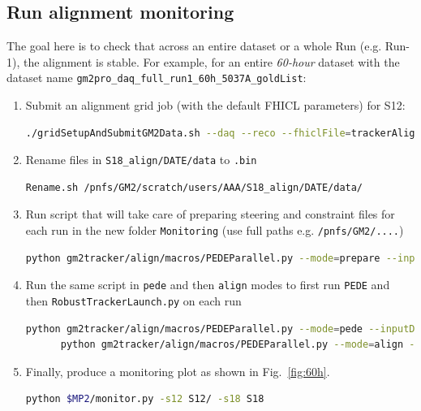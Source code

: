 \documentclass[12pt]{article}
\begin{document}
\subsection{Run alignment monitoring}
The goal here is to check that across an entire dataset or a whole Run (e.g. Run-1), the alignment is stable. For example, for an entire \textit{60-hour} dataset with the dataset name \verb!gm2pro_daq_full_run1_60h_5037A_goldList!:
\begin{enumerate}
    \item Submit an alignment grid job (with the default FHICL parameters) for S12:
    \begin{lstlisting}[language=bash]
     ./gridSetupAndSubmitGM2Data.sh --daq --reco --fhiclFile=trackerAlignment_S12.fcl --localArea --output-dir=/pnfs/GM2/scratch/users/AAA/gm2pro_daq_full_run1_60h_5037A_goldList/S12/ --sam-dataset=gm2pro_daq_full_run1_60h_5037A_goldList --noifdh_art --onebyone --multipleroot --njobs 5000 \end{lstlisting}
     \item Rename files in \verb!S18_align/DATE/data! to \verb!.bin!
     \begin{lstlisting}[language=bash] 
     Rename.sh /pnfs/GM2/scratch/users/AAA/S18_align/DATE/data/\end{lstlisting}
     \item Run script that will take care of preparing steering and constraint files for each run in the new folder \verb!Monitoring! (use full paths e.g. \verb!/pnfs/GM2/....!)
        \begin{lstlisting}[language=bash]
      python gm2tracker/align/macros/PEDEParallel.py --mode=prepare --inputData=gm2pro_daq_full_run1_60h_5037A_goldList/S12/DATE/data/ \end{lstlisting}
      \item Run the same script in \verb!pede! and then \verb!align! modes to first run \verb!PEDE! and then \verb!RobustTrackerLaunch.py! on each run
        \begin{lstlisting}[language=bash]
      python gm2tracker/align/macros/PEDEParallel.py --mode=pede --inputData=gm2pro_daq_full_run1_60h_5037A_goldList/S12/DATE/data/Monitoring/ 
      python gm2tracker/align/macros/PEDEParallel.py --mode=align --inputData=gm2pro_daq_full_run1_60h_5037A_goldList/S12/DATE/data/Monitoring/\end{lstlisting}
       \item Finally, produce a monitoring plot as shown in Fig.~\ref{fig:60h}.
      \begin{lstlisting}[language=bash]
      python $MP2/monitor.py -s12 S12/ -s18 S18 \end{lstlisting}
    \end{enumerate}
\end{document}
